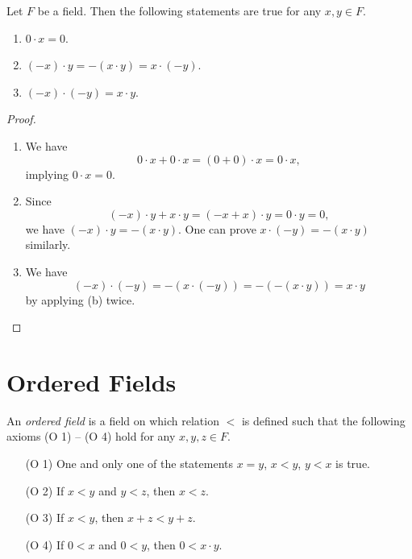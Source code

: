 \begin{theorem}
  Let $F$ be a field.
  Then the following statements are true for any $x, y \in F$.
  \begin{enumerate}
    \item $0 \cdot x = 0$.
    \item $(-x) \cdot y = -(x \cdot y) = x \cdot (-y)$.
    \item $(-x) \cdot (-y) = x \cdot y$.
  \end{enumerate}
\end{theorem}
\begin{proof}
  \leavevmode
  \begin{enumerate}
    \item We have
    \begin{equation*}
      0 \cdot x + 0 \cdot x = (0 + 0) \cdot x = 0 \cdot x,
    \end{equation*}
    implying $0 \cdot x = 0$.
    \item Since
    \begin{equation*}
      (-x) \cdot y + x \cdot y = (-x + x) \cdot y = 0 \cdot y = 0,
    \end{equation*}
    we have $(-x) \cdot y = -(x \cdot y)$.
    One can prove $x \cdot (-y) = -(x \cdot y)$ similarly.
    \item We have
    \begin{equation*}
      (-x) \cdot (-y) = -(x \cdot (-y)) = -(-(x \cdot y)) = x \cdot y
    \end{equation*}
    by applying (b) twice. \qedhere
  \end{enumerate}
\end{proof}

\section{Ordered Fields}
\begin{definition}
  An \emph{ordered field} is a field on which relation $<$ is defined such
  that the following axioms (O 1) -- (O 4) hold for any $x, y, z \in F$.
  \begin{enumerate}[leftmargin=3.5em]
    \item[(O 1)] One and only one of the statements $x = y$, $x < y$, $y < x$
    is true.
    \item[(O 2)] If $x < y$ and $y < z$, then $x < z$.
    \item[(O 3)] If $x < y$, then $x + z < y + z$.
    \item[(O 4)] If $0 < x$ and $0 < y$, then $0 < x \cdot y$.
  \end{enumerate}
\end{definition}

